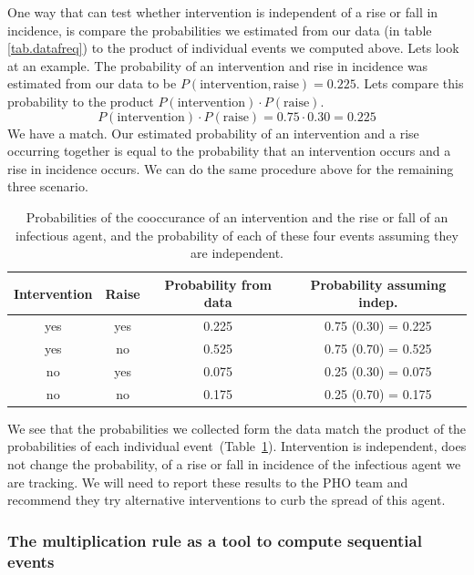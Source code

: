One way that can test whether intervention is independent of a rise or fall in incidence, is compare the probabilities we estimated from our data (in table \ref{tab.datafreq}) to the product of individual events we computed above. 
Lets look at an example.
The probability of an intervention and rise in incidence was estimated from our data to be $P(\text{intervention},\text{raise}) = 0.225$. Lets compare this probability to the product $P(\text{intervention}) \cdot P(\text{raise})$. 
\begin{equation}
    P(\text{intervention}) \cdot P(\text{raise}) = 0.75 \cdot 0.30 = 0.225
\end{equation}
We have a match. 
Our estimated probability of an intervention and a rise occurring together is equal to the probability that an intervention occurs and a rise in incidence occurs.
We can do the same procedure above for the remaining three scenario.

\begin{table}[ht!]
    \centering
    \begin{tabular}{ccc|c}
     \hline
        Intervention & Raise & Probability from data & Probability assuming indep. \\
        \hline
        yes & yes  &  0.225 & 0.75 (0.30) = 0.225  \\
        yes & no   &  0.525 & 0.75 (0.70) = 0.525 \\
        no  & yes  &  0.075 & 0.25 (0.30) = 0.075\\
        no  & no   &  0.175 & 0.25 (0.70) = 0.175\\
        \hline
    \end{tabular}
    \caption{Probabilities of the cooccurance of an intervention and the rise or fall of an infectious agent, and the probability of each of these four events assuming they are independent. \label{tab.indep}}
\end{table}

We see that the probabilities we collected form the data match the product of the probabilities of each individual event~(Table~\ref{tab.indep}). 
Intervention is independent, does not change the probability, of a rise or fall in incidence of the infectious agent we are tracking. 
We will need to report these results to the PHO team and recommend they try alternative interventions to curb the spread of this agent.

\subsubsection{The multiplication rule as a tool to compute sequential events}

